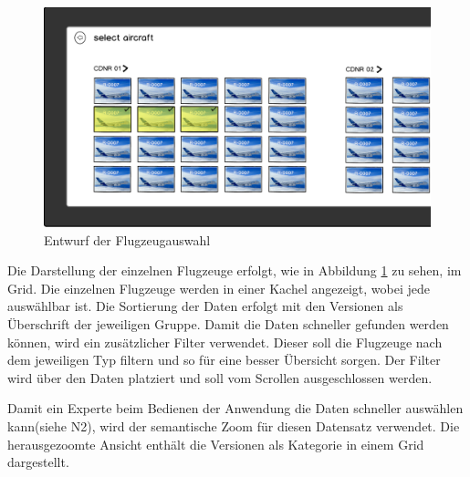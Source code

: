 \begin{figure}
\centering
\includegraphics[width=\hsize]{images/version_entwurf}
\caption{Entwurf der Flugzeugauswahl}
\label{aircraftSketch}
\end{figure}
Die Darstellung der einzelnen Flugzeuge erfolgt, wie in Abbildung \ref{aircraftSketch} zu sehen, im Grid. Die einzelnen Flugzeuge werden in einer Kachel angezeigt, wobei jede auswählbar ist. Die Sortierung der Daten erfolgt mit den Versionen als Überschrift der jeweiligen Gruppe. Damit die Daten schneller gefunden werden können, wird ein zusätzlicher Filter verwendet. Dieser soll die Flugzeuge nach dem jeweiligen Typ filtern und so für eine besser Übersicht sorgen. Der Filter wird über den Daten platziert und soll vom Scrollen ausgeschlossen werden. \par 

Damit ein Experte beim Bedienen der Anwendung die Daten schneller auswählen kann(siehe N2), wird der semantische Zoom für diesen Datensatz verwendet. Die herausgezoomte Ansicht enthält die Versionen als Kategorie in einem Grid dargestellt. 

